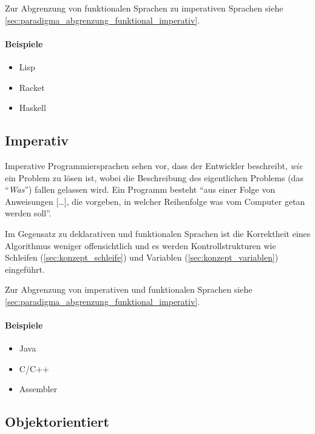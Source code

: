    Zur Abgrenzung von funktionalen Sprachen zu imperativen Sprachen siehe \ref{sec:paradigma_abgrenzung_funktional_imperativ}.
    
    \paragraph{Beispiele}
        \begin{itemize}
            \item Lisp
            \item Racket
            \item Haskell
        \end{itemize}

\subsection{Imperativ}
    \label{sec:paradigma_imperativ}

    Imperative Programmiersprachen sehen vor, dass der Entwickler beschreibt, \textit{wie} ein Problem zu lösen ist, wobei die Beschreibung des eigentlichen Problems (das \enquote{\textit{Was}}) fallen gelassen wird. Ein Programm besteht \enquote{aus einer Folge von Anweisungen [\dots], die vorgeben, in welcher Reihenfolge was vom Computer getan werden soll}. ~\cite{andreas2005grundkurs}
    
    Im Gegensatz zu deklarativen und funktionalen Sprachen ist die Korrektheit eines Algorithmus weniger offensichtlich und es werden Kontrollstrukturen wie Schleifen (\ref{sec:konzept_schleife}) und Variablen (\ref{sec:konzept_variablen}) eingeführt.
    
    Zur Abgrenzung von imperativen und funktionalen Sprachen siehe \ref{sec:paradigma_abgrenzung_funktional_imperativ}.
    
    \paragraph{Beispiele}
        \begin{itemize}
            \item Java
            \item C/C++
            \item Assembler
        \end{itemize}

\subsection{Objektorientiert}
    \label{sec:paradigma_oop}
    
